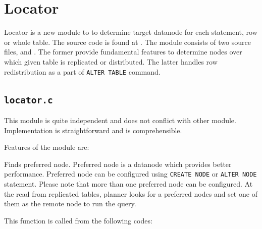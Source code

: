 %
%
%


%
%
\section{\label{sec:locator}Locator}

  Locator is a new module to \XC{} to determine target datanode for each
  statement, row or whole table.
  The source code is found at .
  The module consists of two source files,  and .
  The former provide fundamental features to determine nodes over which
  given table is replicated or distributed.
  The latter handles row redistribution as a part of \texttt{ALTER TABLE} command.



\subsection{\texttt{locator.c}}

  This module is quite independent and does not conflict with other module.
  Implementation is straightforward and is comprehensible.
  
  Features of the module are:
  
  
      Finds preferred node.
      Preferred node is a datanode which provides better performance.
      Preferred node can be configured using \texttt{CREATE NODE} or \texttt{ALTER NODE} statement.
      Please note that more than one preferred node can be configured.
      At the read from replicated tables, planner looks for a preferred nodes and
	  set one of them as the remote node to run the query.
      
      This function is called from the following codes:
      
